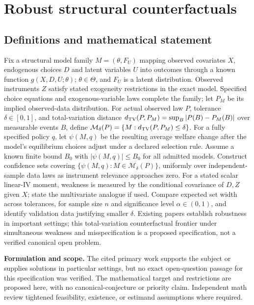 \documentclass[11pt]{article}
\begin{document}
\section*{Robust structural counterfactuals}\label{30007708}
\subsection{Definitions and mathematical statement}
Fix a structural model family \(M=(\theta,F_U)\) mapping observed covariates \(X\), endogenous choices \(D\) and latent variables \(U\) into outcomes through a known function \(g(X,D,U;\theta)\); \(\theta\in\Theta\), and \(F_U\) is a latent distribution. Observed instruments \(Z\) satisfy stated exogeneity restrictions in the exact model. Specified choice equations and exogenous-variable laws complete the family; let \(P_M\) be its implied observed-data distribution. For actual observed law \(P\), tolerance \(\delta\in[0,1]\), and total-variation distance \(d_{\rm TV}(P,P_M)=\sup_B|P(B)-P_M(B)|\) over measurable events \(B\), define \(\mathcal M_\delta(P)=\{M:d_{\rm TV}(P,P_M)\leq\delta\}\). For a fully specified policy \(q\), let \(\psi(M,q)\) be the resulting average welfare change after the model's equilibrium choices adjust under a declared selection rule. Assume a known finite bound \(B_0\) with \(|\psi(M,q)|\leq B_0\) for all admitted models. Construct confidence sets covering \(\{\psi(M,q):M\in\mathcal M_\delta(P)\}\), uniformly over independent-sample data laws as instrument relevance approaches zero. For a stated scalar linear-IV moment, weakness is measured by the conditional covariance of \(D,Z\) given \(X\); state the multivariate analogue if used. Compare expected set width across tolerances, for sample size \(n\) and significance level \(\alpha\in(0,1)\), and identify validation data justifying smaller \(\delta\). Existing papers establish robustness in important settings; this total-variation counterfactual frontier under simultaneous weakness and misspecification is a proposed specification, not a verified canonical open problem.

\par\textbf{Formulation and scope.} The cited primary work supports the subject or supplies solutions in particular settings, but no exact open-question passage for this specification was verified. The mathematical target and restrictions are proposed here, with no canonical-conjecture or priority claim. Independent math review tightened feasibility, existence, or estimand assumptions where required.
\end{document}
